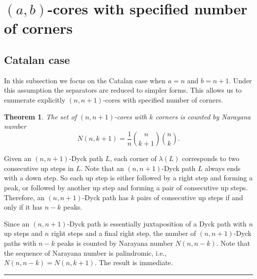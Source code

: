 \documentclass[a4paper,12pt]{article}
\def\proof{\noindent {\it{Proof.} \hskip 2pt}}
\newtheorem{thm}{Theorem}[section]
\newcommand{\qed}{{\hfill\rule{4pt}{7pt}}}
\begin{document}
%


\section{$(a,b)$-cores with specified number of corners}


\subsection{Catalan case}
In this subsection we focus on the Catalan case when $a=n$ and $b=n+1$. Under this assumption the separators are reduced to simpler forms.
This allows us to enumerate explicitly $(n,n+1)$-cores with specified number of corners.


\begin{thm} \label{catalancoreisnarayana}
    The set of $(n,n+1)$-cores with $k$ corners is counted by Narayana number $$N(n,k+1)=\frac{1}{n} {n\choose k+1}{n\choose k}.$$
\end{thm}


\proof
Given an $(n,n+1)$-Dyck path $L$, each corner of $\lambda(L)$ corresponds to two consecutive up steps in $L$.
Note that an $(n,n+1)$-Dyck path $L$ always ends with a down  step.
So each up step is either followed by a right step and forming a peak, or followed by another up step and forming a pair of consecutive up steps.
Therefore, an $(n,n+1)$-Dyck path has $k$ pairs of consecutive up steps if and only if it has $n-k$ peaks.

Since an $(n,n+1)$-Dyck path is essentially juxtaposition of a Dyck path with $n$ up steps and $n$ right steps and a final right step, the number of $(n,n+1)$-Dyck paths with $n-k$ peaks is counted by Narayana number
$N(n,n-k)$. Note that the sequence of  Narayana number is palindromic, i.e., $N(n,n-k)=N(n,k+1)$. The result is immediate.
\qed
\end{document}
